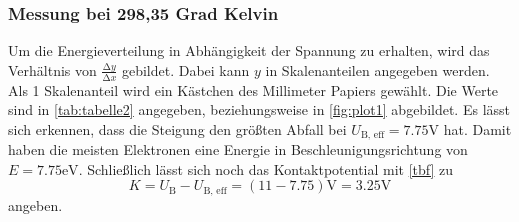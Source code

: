 \subsubsection*{Messung bei 298,35 Grad Kelvin}
Um die Energieverteilung in Abhängigkeit der Spannung zu erhalten, wird das Verhältnis von $\frac{\increment y}{\increment x}$ gebildet.
Dabei kann $y$ in Skalenanteilen angegeben werden.
Als 1 Skalenanteil wird ein Kästchen des Millimeter Papiers gewählt.
Die Werte sind in \autoref{tab:tabelle2} angegeben, beziehungsweise in \autoref{fig:plot1} abgebildet.
Es lässt sich erkennen, dass die Steigung den größten Abfall bei $U_\text{B, eff} = 7.75 \unit\V$ hat.
Damit haben die meisten Elektronen eine Energie in Beschleunigungsrichtung von $E = 7.75 \unit\eV$.
Schließlich lässt sich noch das Kontaktpotential mit \autoref{tbf} zu
\begin{equation}
  K = U_\text{B} - U_\text{B, eff} = (11 - 7.75) \unit\V = 3.25 \unit\V
\end{equation}
angeben.


